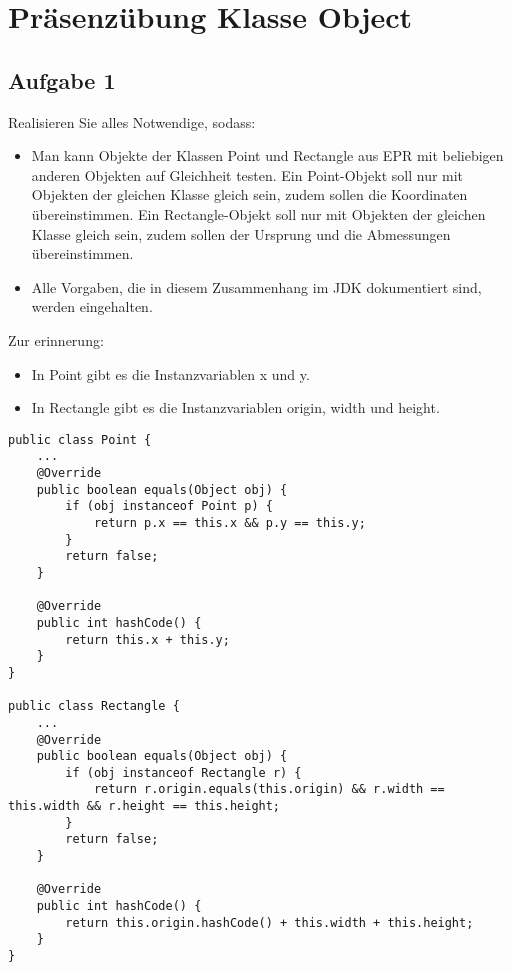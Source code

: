 \chapter{Präsenzübung Klasse Object}

\section{Aufgabe 1}
Realisieren Sie alles Notwendige, sodass:

\begin{itemize}
    \item Man kann Objekte der Klassen Point und Rectangle aus EPR mit beliebigen anderen
          Objekten auf Gleichheit testen. Ein Point-Objekt soll nur mit Objekten der
          gleichen Klasse gleich sein, zudem sollen die Koordinaten übereinstimmen. Ein
          Rectangle-Objekt soll nur mit Objekten der gleichen Klasse gleich sein, zudem
          sollen der Ursprung und die Abmessungen übereinstimmen.
    \item Alle Vorgaben, die in diesem Zusammenhang im JDK dokumentiert sind, werden
          eingehalten.
\end{itemize}

Zur erinnerung:
\begin{itemize}
    \item In Point gibt es die Instanzvariablen x und y.
    \item In Rectangle gibt es die Instanzvariablen origin, width und height.
\end{itemize}

\begin{lstlisting}
public class Point {
    ...
    @Override 
    public boolean equals(Object obj) {
        if (obj instanceof Point p) {
            return p.x == this.x && p.y == this.y;
        }
        return false;
    }

    @Override
    public int hashCode() {
        return this.x + this.y;
    }
}

public class Rectangle {
    ...
    @Override 
    public boolean equals(Object obj) {
        if (obj instanceof Rectangle r) {
            return r.origin.equals(this.origin) && r.width == this.width && r.height == this.height;
        }
        return false;
    }

    @Override
    public int hashCode() {
        return this.origin.hashCode() + this.width + this.height;
    }
}
\end{lstlisting}